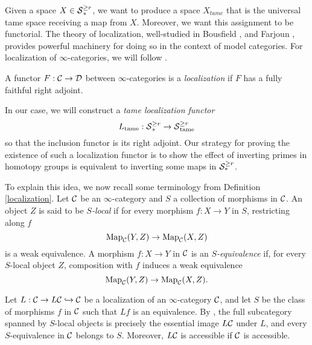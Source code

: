     
Given a space $X\in \operatorname{\mathcal{S}}^{\geq r}_{*}$, we want to produce a space $X_{tame}$ that is the universal tame space receiving a map from $X$. Moreover, we want this assignment to be functorial. The theory of localization, well-studied in Bousfield \cite{BousfieldSpaces}, \cite{BousfieldSpectra} and Farjoun \cite{Farjoun}, provides powerful machinery for doing so in the context of model categories.
For localization of $\infty$-categories, we will follow \cite{HTT}.
\begin{definition}
    \cite[Definition 5.2.7.2.]{HTT}
    A functor $F:{\mathcal{C}}\to {\mathcal{D}}$ between $\infty$-categories is a \emph{localization} if $F$ has a fully faithful right adjoint.
\end{definition}
In our case, we will construct a \emph{tame localization functor}
$$
L_{\operatorname{\operatorname{tame}}}: \operatorname{\mathcal{S}}^{\geq r}_* \to \operatorname{\mathcal{S}}^{\geq r}_{\operatorname{\operatorname{tame}}}
$$
so that the inclusion functor is its right adjoint.
Our strategy for proving the existence of such a localization functor is to show the effect of inverting primes in homotopy groups is equivalent to inverting some maps in ${\mathcal{S}}^{\geq r}_{*}$.

To explain this idea, we now recall some terminology from Definition \ref{localization}. 
Let ${\mathcal{C}}$ be an $\infty$-category and $S$ a collection of morphisms in ${\mathcal{C}}$.
An object $Z$ is said to be \emph{$S$-local} if for every morphism $f:X\to Y$ in $S$, restricting along $f$ 
$$
\operatorname{Map}_{{\mathcal{C}}}(Y,Z) \to \operatorname{Map}_{{\mathcal{C}}}(X,Z)
$$
is a weak equivalence.
A morphism $f:X\to Y$ in ${\mathcal{C}}$ is an \emph{$S$-equivalence} if, for every $S$-local object $Z$, composition with $f$ induces a weak equivalence 
$$
\operatorname{Map}_{{\mathcal{C}}}(Y,Z) \to \operatorname{Map}_{{\mathcal{C}}}(X,Z).
$$
\begin{remark}
    Let $L:{\mathcal{C}} \to L{\mathcal{C}} \hookrightarrow {\mathcal{C}}$ be a localization of an $\infty$-category ${\mathcal{C}}$, and let $S$ be the class of morphisms $f$ in ${\mathcal{C}}$ such that $Lf$ is an equivalence.
    By \cite[Proposition 5.5.4.2.]{HTT}, the full subcategory spanned by $S$-local objects is precisely the essential image $L{\mathcal{C}}$ under $L$, and every $S$-equivalence in ${\mathcal{C}}$ belongs to $S$. Moreover,  $L{\mathcal{C}}$ is accessible if ${\mathcal{C}}$ is accessible.
\end{remark}

